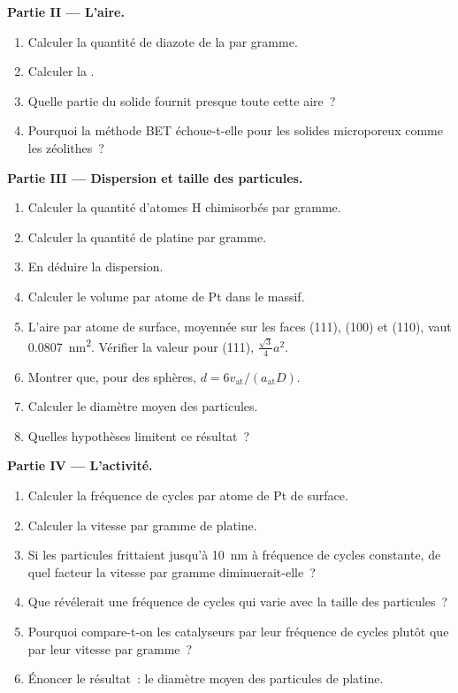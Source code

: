 \begin{problem}
\medskip\noindent\textbf{Partie II --- L'aire.}
\begin{enumerate}[resume]
  \item Calculer la quantité de diazote de la  par gramme.
  \item Calculer la .
  \item Quelle partie du solide fournit presque toute cette aire~?
  \item Pourquoi la méthode BET échoue-t-elle pour les solides
        microporeux comme les zéolithes~?
\end{enumerate}

\medskip\noindent\textbf{Partie III --- Dispersion et taille des particules.}
\begin{enumerate}[resume]
  \item Calculer la quantité d'atomes H chimisorbés par gramme.
  \item Calculer la quantité de platine par gramme.
  \item En déduire la dispersion.
  \item Calculer le volume par atome de Pt dans le massif.
  \item L'aire par atome de surface, moyennée sur les faces (111), (100) et
        (110), vaut \qty{0.0807}{nm^2}. Vérifier la valeur pour (111),
        $\frac{\sqrt3}{4}a^2$.
  \item Montrer que, pour des sphères, $d = 6v_{\mathrm{at}}/(a_{\mathrm{at}}D)$.
  \item Calculer le diamètre moyen des particules.
  \item Quelles hypothèses limitent ce résultat~?
\end{enumerate}

\medskip\noindent\textbf{Partie IV --- L'activité.}
\begin{enumerate}[resume]
  \item Calculer la fréquence de cycles par atome de Pt de surface.
  \item Calculer la vitesse par gramme de platine.
  \item Si les particules frittaient jusqu'à \qty{10}{nm} à fréquence de
        cycles constante, de quel facteur la vitesse par gramme
        diminuerait-elle~?
  \item Que révélerait une fréquence de cycles qui varie avec la taille
        des particules~?
  \item Pourquoi compare-t-on les catalyseurs par leur fréquence de
        cycles plutôt que par leur vitesse par gramme~?
  \item Énoncer le résultat~: le diamètre moyen des particules de platine.
\end{enumerate}
\end{problem}
